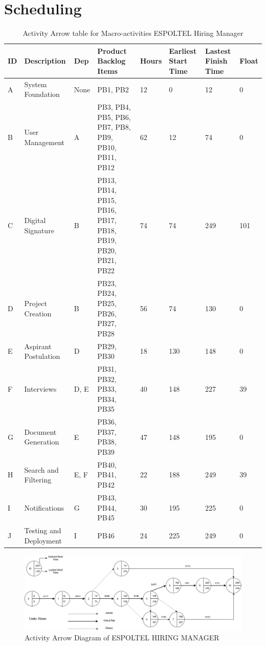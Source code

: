 \documentclass{scrreprt}
\begin{document}
\section{Scheduling}
\begin{table}[H]
	\centering
	\begin{tabular}{|p{.5cm}|p{3cm}|p{1cm}|p{3cm}|p{1cm}|p{1.5cm}|p{1.5cm}|p{1.5cm}|}
		\hline
		\textbf{ID} & \textbf{Description} & \textbf{Dep} & \textbf{Product Backlog Items} & \textbf{Hours} & \textbf{Earliest Start Time}& \textbf{Lastest Finish Time}& \textbf{Float}\\ \hline
		A &  System Foundation & None & PB1, PB2 & 12 & 0 & 12 & 0 \\ \hline
		B & User Management & A & PB3, PB4, PB5, PB6, PB7, PB8, PB9, PB10, PB11, PB12 & 62 & 12 & 74 & 0\\ \hline
		C & Digital Signature & B &  PB13, PB14, PB15, PB16, PB17, PB18, PB19, PB20, PB21, PB22 & 74  & 74  & 249 & 101 \\ \hline
		D & Project Creation & B & PB23, PB24, PB25, PB26, PB27, PB28 & 56 & 74 & 130 &  0 \\ \hline
		E & Aspirant Postulation & D & PB29, PB30 & 18 & 130 & 148 & 0 \\ \hline
	    F & Interviews & D, E & PB31, PB32, PB33, PB34, PB35 & 40 & 148 & 227 & 39 \\ \hline
		G & Document Generation & E & PB36, PB37, PB38, PB39 & 47 & 148 & 195 & 0 \\ \hline
		H & Search and Filtering &  E, F  & PB40, PB41, PB42 & 22 & 188 & 249 & 39 \\ \hline
		I & Notifications & G  & PB43, PB44, PB45 & 30 & 195 & 225 & 0 \\ \hline
		J & Testing and Deployment & I & PB46 & 24 & 225 & 249 & 0 \\ \hline 
	\end{tabular}
	\caption{Activity Arrow table for Macro-activities ESPOLTEL Hiring Manager}
	\label{Activities}
\end{table}

\begin{figure}[H]
	\centering  \small
	\includegraphics[width=17cm]{ActivityArrowDiagram.png} 
	\caption{Activity Arrow Diagram of ESPOLTEL HIRING MANAGER}
	\label{fig:ActivityArrowDiagram}
\end{figure}
\end{document}
